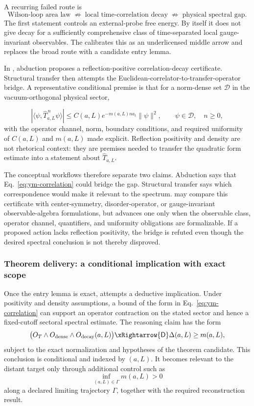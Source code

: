 A recurring failed route is
\[
  \text{Wilson-loop area law}
  \;\nRightarrow\;
  \text{local time-correlation decay}
  \;\nRightarrow\;
  \text{physical spectral gap}.
\]
The first statement controls an external-probe free energy. By itself it does
not give decay for a sufficiently comprehensive class of time-separated local
gauge-invariant observables. The 
calibrates this as an underlicensed middle arrow and replaces the broad route
with a candidate entry lemma.

\begin{sloppypar}
In , abduction proposes a
reflection-positive correlation-decay certificate. Structural transfer then
attempts the Euclidean-correlator-to-transfer-operator bridge. A representative
conditional premise is that for a norm-dense set $\mathcal{D}$ in the
vacuum-orthogonal physical sector,
\end{sloppypar}
\[
  \left|\langle\psi,\widehat{T}_{a,L}^{\,n}\psi\rangle\right|
  \leq C(a,L)e^{-m(a,L)na_t}\lVert\psi\rVert^2,
  \qquad \psi\in\mathcal{D},\quad n\geq0,
  \tag{1}\label{eq:ym-correlation}
\]
with the operator channel, norm, boundary conditions, and required uniformity
of $C(a,L)$ and $m(a,L)$ made explicit. Reflection positivity and density are
not rhetorical context: they are premises needed to transfer the quadratic
form estimate into a statement about $\widehat{T}_{a,L}$.

The conceptual workflows therefore separate two claims. Abduction says that
Eq.~\eqref{eq:ym-correlation} could bridge the gap. Structural transfer says
which correspondence would make it relevant to the spectrum.
 may compare this certificate with
center-symmetry, disorder-operator, or gauge-invariant observable-algebra
formulations, but advances one only when the observable class, operator
channel, quantifiers, and uniformity obligations are formalizable. If a
proposed action lacks reflection positivity, the bridge is refuted even though
the desired spectral conclusion is not thereby disproved.

\subsubsection{Theorem delivery: a conditional implication with exact scope}

Once the entry lemma is exact,  attempts a
deductive implication. Under positivity and density assumptions, a bound of
the form in Eq.~\eqref{eq:ym-correlation} can support an operator contraction
on the stated sector and hence a fixed-cutoff sectoral spectral estimate. The
reasoning claim has the form
\[
  \bigl(O_T\wedge O_{\mathrm{dense}}\wedge
        O_{\mathrm{decay}}(a,L)\bigr)
  \xRightarrow{\mathsf{D}}
  \Delta(a,L)\geq m(a,L),
\]
subject to the exact normalization and hypotheses of the theorem candidate.
This conclusion is conditional and indexed by $(a,L)$. It becomes relevant to
the distant target only through additional control such as
\[
  \inf_{(a,L)\in\Gamma}m(a,L)>0
\]
along a declared limiting trajectory $\Gamma$, together with the required
reconstruction result.

